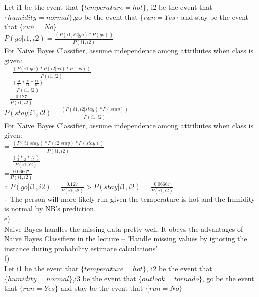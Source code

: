 \documentclass[12pt]{article}
\begin{document}
Let i1 be the event that $\{temperature = hot\}$, i2 be the event that $\{humidity = normal\}$,go be the event that $\{run = Yes\}$ and stay be the event that $\{run = No\}$\\

$P(go|i1,i2) = \frac{(P(i1,i2|go)*P(go))}{P(i1,i2)}$\\

For Naive Bayes Classifier, assume independence among attributes when class is given:\\

= $\frac{(P(i1|go)*P(i2|go)*P(go))}{P(i1,i2)}$\\

= $\frac{(\frac{3}{11}*\frac{7}{11}*\frac{11}{15})}{P(i1,i2)}$\\

=$\frac{0.127}{P(i1,i2)}$\\

$P(stay|i1,i2) = \frac{(P(i1,i2|stay)*P(stay))}{P(i1,i2)}$\\

For Naive Bayes Classifier, assume independence among attributes when class is given:\\

= $\frac{(P(i1|stay)*P(i2|stay)*P(stay))}{P(i1,i2)}$\\

= $\frac{(\frac{1}{2}*\frac{1}{2}*\frac{4}{15})}{P(i1,i2)}$\\

=$\frac{0.06667}{P(i1,i2)}$\\

$\because$ $P(go|i1,i2) = \frac{0.127}{P(i1,i2)} > P(stay|i1,i2) = \frac{0.06667}{P(i1,i2)}$\\

$\therefore$ The person will more likely run given the temperature is hot and the humidity is normal by NB's prediction.\\

e)\\

Naive Bayes handles the missing data pretty well. It obeys the advantages of Naive Bayes Classifiers in the lecture -- 'Handle missing values by ignoring the instance during probability estimate calculations'\\

f)\\
Let i1 be the event that $\{temperature = hot\}$, i2 be the event that $\{humidity = normal\}$,i3 be the event that $\{outlook = tornado\}$, go be the event that $\{run = Yes\}$ and stay be the event that $\{run = No\}$\\
\end{document}
